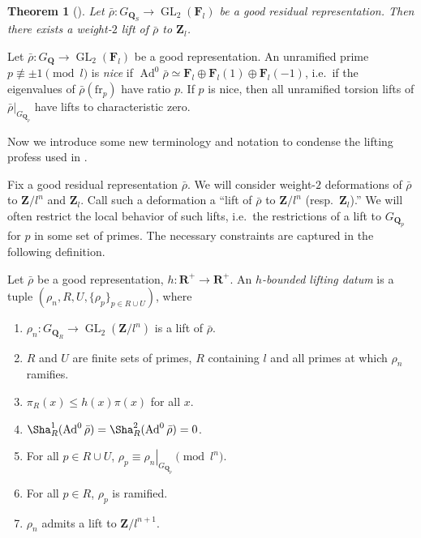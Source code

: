 \documentclass{article}
\DeclareMathOperator{\Ad}{Ad}
\DeclareMathOperator{\GL}{GL}
\newcommand{\bF}{\mathbf{F}}
\newcommand{\bQ}{\mathbf{Q}}
\newcommand{\bR}{\mathbf{R}}
\newcommand{\bZ}{\mathbf{Z}}
\newcommand{\frob}{\mathrm{fr}}
\newtheorem{theorem}{Theorem}
\begin{document}
\begin{theorem}[{\cite[Th.~1]{ravi-FM}}]\label{thm:always-can-lift}
Let $\bar\rho\colon G_{\bQ_S} \to \GL_2(\bF_l)$ be a good residual 
representation. Then there exists a weight-$2$ lift of $\bar\rho$ to $\bZ_l$. 
\end{theorem}


Let $\bar\rho\colon G_\bQ\to \GL_2(\bF_l)$ be a good representation. An 
unramified prime $p\not\equiv \pm 1\pmod l$ is \emph{nice} if 
$\Ad^0\bar\rho\simeq \bF_l \oplus \bF_l(1)\oplus \bF_l(-1)$, i.e.~if the 
eigenvalues of $\bar\rho(\frob_p)$ have ratio $p$. If $p$ is nice, then all 
unramified torsion lifts of $\left.\bar\rho\right|_{G_{\bQ_p}}$ have lifts to 
characteristic zero. 

Now we introduce some new terminology and notation to condense the lifting 
profess used in \cite{klr}. 

Fix a good residual representation $\bar\rho$. We will consider weight-$2$ 
deformations of $\bar\rho$ to $\bZ/l^n$ and $\bZ_l$. Call such a deformation a 
``lift of $\bar\rho$ to $\bZ/l^n$ (resp.~$\bZ_l$).'' We will often restrict the 
local behavior of such lifts, i.e.~the restrictions of a lift to $G_{\bQ_p}$ 
for $p$ in some set of primes. The necessary constraints are captured in the 
following definition. 


Let $\bar\rho$ be a good representation, $h\colon \bR^+ \to \bR^+$. An 
\emph{$h$-bounded lifting datum} is a tuple 
$(\rho_n,R,U,\{\rho_p\}_{p\in R\cup U})$, where 
\begin{enumerate}
\item
$\rho_n\colon G_{\bQ_R} \to \GL_2(\bZ/l^n)$ is a lift of $\bar\rho$.

\item
$R$ and $U$ are finite sets of primes, $R$ containing $l$ and all primes at 
which $\rho_n$ ramifies. 

\item
$\pi_R(x)\leqslant h(x)\pi(x)$ for all $x$. 

\item
$\Sha_R^1(\Ad^0\bar\rho) = \Sha_R^2(\Ad^0\bar\rho) = 0$. 

\item
For all $p\in R\cup U$, 
$\rho_p\equiv \left. \rho_n\right|_{G_{\bQ_p}}\pmod{l^n}$. 

\item
For all $p\in R$, $\rho_p$ is ramified. 

\item
$\rho_n$ admits a lift to $\bZ/l^{n+1}$. 
\end{enumerate}
\end{document}
